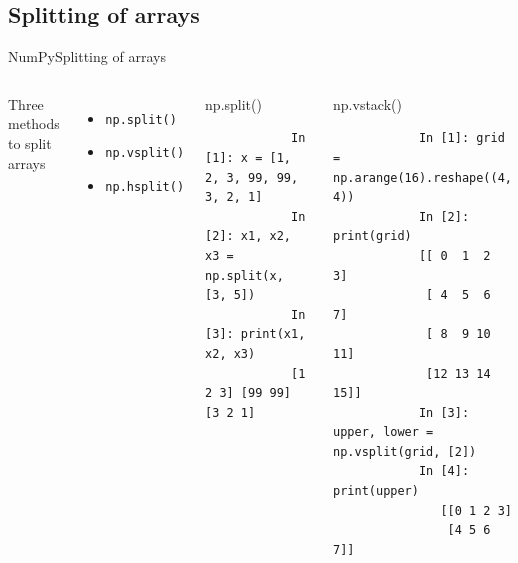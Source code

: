 \documentclass[10pt,compress]{beamer} %
\begin{document}
\subsection{Splitting of arrays}
\begin{frame}[fragile]{NumPy}{Splitting of arrays}
	\begin{columns}
		Three methods to split arrays
		\begin{itemize}
			\item \texttt{np.split()}
			\item \texttt{np.vsplit()}
			\item \texttt{np.hsplit()}
		\end{itemize}

		\begin{exampleblock}{\footnotesize{np.split()}}
		\vspace{-0.2cm} 
			\begin{lstlisting}
			In [1]: x = [1, 2, 3, 99, 99, 3, 2, 1]
			In [2]: x1, x2, x3 = np.split(x, [3, 5])
			In [3]: print(x1, x2, x3)
			[1 2 3] [99 99] [3 2 1]
			\end{lstlisting}
		\vspace{-0.2cm} 
		\end{exampleblock}

		\begin{exampleblock}{\footnotesize{np.vstack()}}
		\vspace{-0.2cm} 
			\begin{lstlisting}
			In [1]: grid = np.arange(16).reshape((4, 4))
			In [2]: print(grid)
			[[ 0  1  2  3]
			 [ 4  5  6  7]
			 [ 8  9 10 11]
			 [12 13 14 15]]
			In [3]: upper, lower = np.vsplit(grid, [2])
			In [4]: print(upper)
			   [[0 1 2 3]
			    [4 5 6 7]]
			\end{lstlisting}
		\vspace{-0.2cm} 
		\end{exampleblock}
	\end{columns}
\end{frame}
\end{document}
